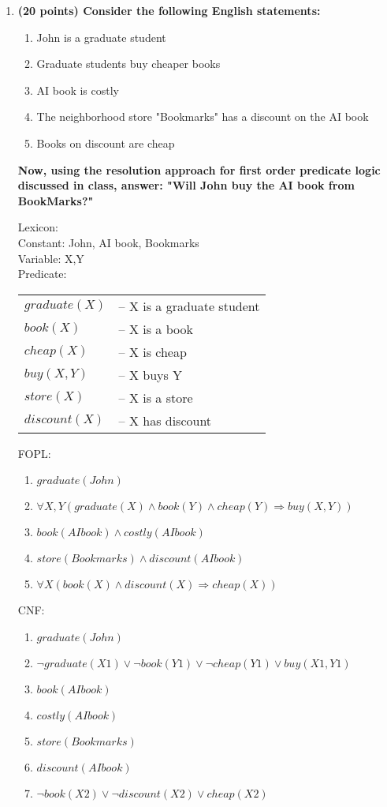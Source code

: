 \documentclass{article}%
\begin{document}
\begin{enumerate}
\item \textbf{(20 points) Consider the following English statements:}
	\begin{enumerate}
	\item John is a graduate student
	\item Graduate students buy cheaper books
	\item AI book is costly
	\item The neighborhood store "Bookmarks" has a discount on the AI book
	\item Books on discount are cheap
	\end{enumerate}

\textbf{Now, using the resolution approach for first order predicate logic discussed in class, answer: "Will John buy the AI book from BookMarks?"}

Lexicon: \\
Constant: John, AI book, Bookmarks \\
Variable: X,Y\\
Predicate: \\
\begin{tabular}{p{2.5cm}l}
 $graduate(X)$ & -- X is a graduate student \\ 
 $book(X)$ & -- X is a book  \\
 $cheap(X)$ & -- X is cheap  \\
$ buy(X,Y)$ & -- X buys Y \\
 $store(X)$ & -- X is a store  \\ 
 $discount(X)$ & -- X has discount  \\ 
\end{tabular} 



FOPL:
\begin{enumerate}
\item $ graduate(John) $
\item $ \forall X, Y (graduate(X) \wedge book(Y) \wedge cheap(Y) \Rightarrow buy(X,Y) ) $
\item $ book(AI book) \wedge costly(AI book) $
\item $ store(Bookmarks) \wedge discount(AI book) $
\item $ \forall X (book(X) \wedge discount(X) \Rightarrow cheap(X)) $
\end{enumerate}

CNF:
\begin{enumerate}
\item $ graduate(John) $
\item $ \neg graduate(X1) \vee \neg book(Y1) \vee \neg cheap(Y1) \vee buy(X1,Y1) $
\item $ book(AI book) $
\item $ costly(AI book) $
\item $ store(Bookmarks) $
\item $ discount(AI book) $
\item $ \neg book(X2) \vee \neg discount(X2) \vee cheap(X2) $
\end{enumerate}


\end{enumerate}
\end{document}
